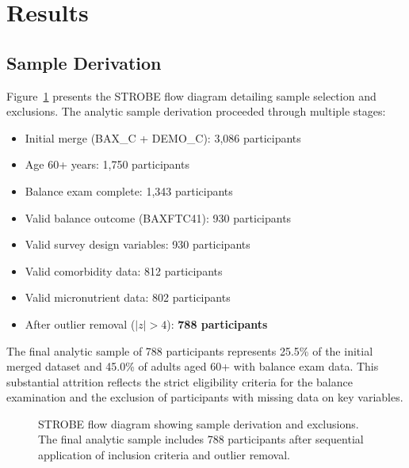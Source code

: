 \documentclass[11pt,a4paper]{article}
\begin{document}
\section{Results}

\subsection{Sample Derivation}

Figure~\ref{fig:strobe} presents the STROBE flow diagram detailing sample selection and exclusions. The analytic sample derivation proceeded through multiple stages:

\begin{itemize}
    \item Initial merge (BAX\_C + DEMO\_C): 3,086 participants
    \item Age 60+ years: 1,750 participants
    \item Balance exam complete: 1,343 participants
    \item Valid balance outcome (BAXFTC41): 930 participants
    \item Valid survey design variables: 930 participants
    \item Valid comorbidity data: 812 participants
    \item Valid micronutrient data: 802 participants
    \item After outlier removal ($|z| > 4$): \textbf{788 participants}
\end{itemize}

The final analytic sample of 788 participants represents 25.5\% of the initial merged dataset and 45.0\% of adults aged 60+ with balance exam data. This substantial attrition reflects the strict eligibility criteria for the balance examination and the exclusion of participants with missing data on key variables.

\begin{figure}[htbp]
\centering
{}
\caption{STROBE flow diagram showing sample derivation and exclusions. The final analytic sample includes 788 participants after sequential application of inclusion criteria and outlier removal.}
\label{fig:strobe}
\end{figure}
\end{document}
